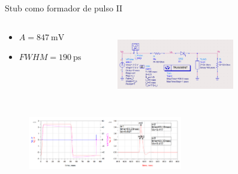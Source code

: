 \documentclass{beamer}
\begin{document}
\begin{frame}{Stub como formador de pulso II}

    \begin{columns}[c]
      \begin{block}{}
          \begin{itemize}
              \item $A = \qty{847}{\milli\volt}$
              \item $FWHM = \qty{190}{\pico\second}$
          \end{itemize}
      \end{block}
        \begin{figure}[t!]
            \centering
            \includegraphics[width=0.7\textwidth]{images/stub_generator_circuit.png}
            \label{fig:stub_generator_circuit}
        \end{figure}
    \end{columns}


    \begin{figure}[t!]
        \centering
        \includegraphics[width=0.6\textwidth]{images/stub_generator_sim_result.png}
        \label{fig:stub_generator_sim_result}
    \end{figure}

\end{frame}
\end{document}
